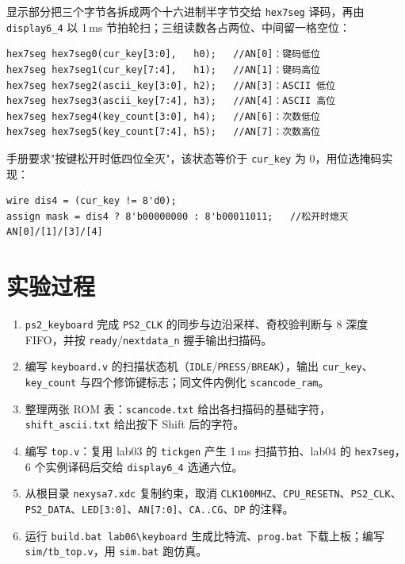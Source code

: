 \documentclass[12pt, a4paper]{ctexart}
\begin{document}
显示部分把三个字节各拆成两个十六进制半字节交给 \texttt{hex7seg} 译码，再由 \texttt{display6\_4} 以 1\,ms 节拍轮扫；三组读数各占两位、中间留一格空位：

\begin{lstlisting}
hex7seg hex7seg0(cur_key[3:0],   h0);   //AN[0]：键码低位
hex7seg hex7seg1(cur_key[7:4],   h1);   //AN[1]：键码高位
hex7seg hex7seg2(ascii_key[3:0], h2);   //AN[3]：ASCII 低位
hex7seg hex7seg3(ascii_key[7:4], h3);   //AN[4]：ASCII 高位
hex7seg hex7seg4(key_count[3:0], h4);   //AN[6]：次数低位
hex7seg hex7seg5(key_count[7:4], h5);   //AN[7]：次数高位
\end{lstlisting}

\noindent 手册要求"按键松开时低四位全灭"，该状态等价于 \texttt{cur\_key} 为 0，用位选掩码实现：

\begin{lstlisting}
wire dis4 = (cur_key != 8'd0);
assign mask = dis4 ? 8'b00000000 : 8'b00011011;   //松开时熄灭 AN[0]/[1]/[3]/[4]
\end{lstlisting}

\section{实验过程}
\begin{enumerate}
    \item \texttt{ps2\_keyboard} 完成 \texttt{PS2\_CLK} 的同步与边沿采样、奇校验判断与 8 深度 FIFO，并按 \texttt{ready}/\texttt{nextdata\_n} 握手输出扫描码。
    \item 编写 \texttt{keyboard.v} 的扫描状态机（\texttt{IDLE}/\texttt{PRESS}/\texttt{BREAK}），输出 \texttt{cur\_key}、\texttt{key\_count} 与四个修饰键标志；同文件内例化 \texttt{scancode\_ram}。
    \item 整理两张 ROM 表：\texttt{scancode.txt} 给出各扫描码的基础字符，\texttt{shift\_ascii.txt} 给出按下 Shift 后的字符。
    \item 编写 \texttt{top.v}：复用 lab03 的 \texttt{tickgen} 产生 1\,ms 扫描节拍、lab04 的 \texttt{hex7seg}，6 个实例译码后交给 \texttt{display6\_4} 选通六位。
    \item 从根目录 \texttt{nexysa7.xdc} 复制约束，取消 \texttt{CLK100MHZ}、\texttt{CPU\_RESETN}、\texttt{PS2\_CLK}、\texttt{PS2\_DATA}、\texttt{LED[3:0]}、\texttt{AN[7:0]}、\texttt{CA..CG}、\texttt{DP} 的注释。
    \item 运行 \texttt{build.bat lab06\textbackslash keyboard} 生成比特流、\texttt{prog.bat} 下载上板；编写 \texttt{sim/tb\_top.v}，用 \texttt{sim.bat} 跑仿真。
\end{enumerate}
\end{document}
